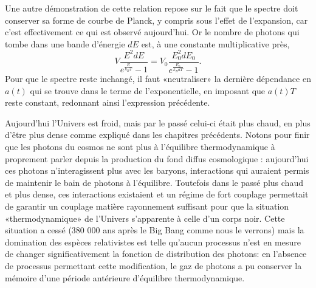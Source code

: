Une autre démonstration de cette relation repose sur le fait que le spectre doit conserver sa forme de courbe de Planck, y compris sous l'effet de l'expansion, car c'est effectivement ce qui est observé aujourd'hui. Or le nombre de photons qui tombe dans une bande d'énergie $dE$ est, à une constante multiplicative près,
\begin{equation}
V \frac{E^2 dE}{e^{\frac{E}{k_B T}}-1}=V_0 \frac{E_0^2 dE_0}{e^{\frac{E_0}{k_B aT}}-1}.
\end{equation}
Pour que le spectre reste inchangé, il faut «neutraliser» la dernière dépendance en $a(t)$ qui se trouve dans le terme de l'exponentielle, en imposant que $a(t) T$ reste constant, redonnant ainsi l'expression précédente.


Aujourd'hui l'Univers est froid, mais par le passé celui-ci était plus chaud, en plus d'être plus dense comme expliqué dans les chapitres précédents. Notons pour finir que les photons du cosmos ne sont plus à l'équilibre thermodynamique à proprement parler depuis la production du fond diffus cosmologique : aujourd'hui ces photons n'interagissent plus avec les baryons, interactions qui auraient permis de maintenir le bain de photons à l'équilibre. Toutefois dans le passé plus chaud et plus dense, ces interactions existaient et un régime de fort couplage permettait de garantir un couplage matière rayonnement suffisant pour que la situation «thermodynamique» de l'Univers s'apparente à celle d'un corps noir. Cette situation a cessé (380 000 ans après le Big Bang comme nous le verrons) mais la domination des espèces relativistes est telle qu'aucun processus n'est en mesure de changer significativement la fonction de distribution des photons: en l'absence de processus permettant cette modification, le gaz de photons a pu conserver la mémoire d'une période antérieure d'équilibre thermodynamique.


